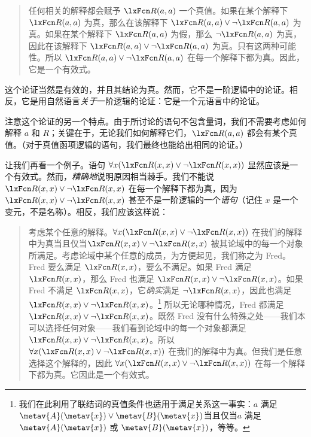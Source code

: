 \begin{quote}
		\label{allmodels1}
		任何相关的解释都会赋予 $\atom{R}{a,a}$ 一个真值。如果在某个解释下 $\atom{R}{a,a}$ 为真，那么在该解释下 $\atom{R}{a,a} \eor \enot\atom{R}{a,a}$ 为真。如果在某个解释下 $\atom{R}{a,a}$ 为假，那么 $\enot\atom{R}{a,a}$ 为真，因此在该解释下 $\atom{R}{a,a} \eor\enot \atom{R}{a,a}$ 为真。只有这两种可能性。所以 $\atom{R}{a,a} \eor\enot \atom{R}{a,a}$ 在每一个解释下都为真。因此，它是一个有效式。
	\end{quote}


这个论证当然是有效的，并且其结论为真。然而，它不是一阶逻辑中的论证。相反，它是用自然语言\emph{关于}一阶逻辑的论证：它是一个元语言中的论证。

注意这个论证的另一个特点。由于所讨论的语句不包含量词，我们不需要考虑如何解释 $a$ 和 $R$；关键在于，无论我们如何解释它们，$\atom{R}{a,a}$ 都会有某个真值。（对于真值函项逻辑的语句，我们最终也能给出相同的论证。）

让我们再看一个例子。语句 $\forall x(\atom{R}{x,x}\eor\enot \atom{R}{x,x})$ 显然应该是一个有效式。然而，\emph{精确地}说明原因相当棘手。我们不能说 $\atom{R}{x,x} \eor\enot \atom{R}{x,x}$ 在每一个解释下都为真，因为 $\atom{R}{x,x} \eor\enot \atom{R}{x,x}$ 甚至不是一阶逻辑的一个\emph{语句}（记住 $x$ 是一个变元，不是名称）。相反，我们应该这样说：


\begin{quote}
		考虑某个任意的解释。$\forall x(\atom{R}{x,x}\eor \enot\atom{R}{x,x})$ 在我们的解释中为真当且仅当$\atom{R}{x,x}\eor\enot\atom{R}{x,x}$ 被其论域中的每一个对象所满足。考虑论域中某个任意的成员，为方便起见，我们称之为 Fred。Fred 要么满足 $\atom{R}{x,x}$，要么不满足。如果 Fred 满足 $\atom{R}{x,x}$，那么 Fred 也满足 $\atom{R}{x,x} \eor \enot \atom{R}{x,x}$。如果 Fred 不满足 $\atom{R}{x,x}$，它\emph{确实}满足 $\enot\atom{R}{x,x}$，因此也满足 $\atom{R}{x,x} \eor\enot \atom{R}{x,x}$。\footnote{我们在此利用了联结词的真值条件也适用于满足关系这一事实：$a$ 满足 $\metav{A}(\metav{x}) \lor \metav{B}(\metav{x})$当且仅当$a$ 满足 $\metav{A}(\metav{x})$ 或 $\metav{B}(\metav{x})$，等等。} 所以无论哪种情况，Fred 都满足 $\atom{R}{x,x} \eor\enot \atom{R}{x,x}$。既然 Fred 没有什么特殊之处——我们本可以选择任何对象——我们看到论域中的每一个对象都满足 $\atom{R}{x,x} \eor\enot \atom{R}{x,x}$。所以 $\forall x (\atom{R}{x,x} \eor\enot \atom{R}{x,x})$ 在我们的解释中为真。但我们是任意选择这个解释的，因此 $\forall x (\atom{R}{x,x} \eor\enot \atom{R}{x,x})$ 在每一个解释下都为真。它因此是一个有效式。
	\end{quote}


